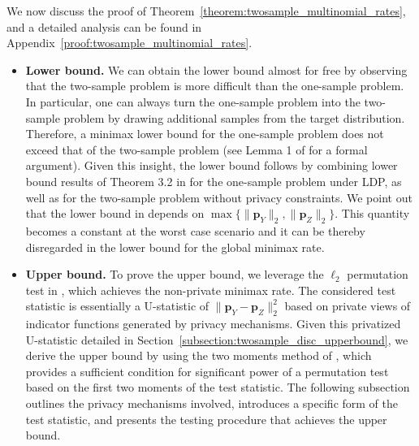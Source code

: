 \documentclass[twoside,11pt]{article}
\newcommand{\rvTwo}{Y}
\newcommand{\rvThree}{Z}
\newcommand{\vectorize}[1]{\mathbf{#1}}
\newcommand{\probVec}{\mathbf{p}} %
\begin{document}
We now discuss the proof of Theorem~\ref{theorem:twosample_multinomial_rates}, and a detailed analysis can be found in Appendix~\ref{proof:twosample_multinomial_rates}.
\begin{itemize}
	\item \textbf{Lower bound.} We can obtain the lower bound almost for free by observing that the two-sample problem is more difficult than the one-sample problem. In particular, one can always turn the one-sample problem into the two-sample problem by drawing additional samples from the target distribution. Therefore, a minimax lower bound for the one-sample problem does not exceed that of the two-sample problem  (see Lemma 1 of \citet{Arias-Castro2018RememberDimension} for a formal argument). Given this insight, the lower bound follows by combining lower bound results of Theorem 3.2 in \citep{Lam-Weil2021MinimaxConstraint} for the one-sample problem under LDP, as well as \citep{chan2014optimal,kim_minimax_2022} for the two-sample problem without privacy constraints. We point out that the lower bound in \citep{chan2014optimal,kim_minimax_2022} depends on $\max\{\|\vectorize{p}_Y\|_2, \|\vectorize{p}_Z\|_2\}$. This quantity becomes a constant at the worst case scenario and it can be thereby disregarded in the lower bound for the global minimax rate.
	\item \textbf{Upper bound.} To prove the upper bound, we leverage the $\ell_2$ permutation test in \cite{kim_minimax_2022}, which achieves the non-private minimax rate. The considered test statistic is essentially a U-statistic of $\| \probVec_\rvTwo - \probVec_\rvThree \|_2^2$ based on private views of indicator functions generated by privacy mechanisms. Given this privatized U-statistic detailed in Section~\ref{subsection:twosample_disc_upperbound}, we derive the upper bound by using the two moments method of \citet{kim_minimax_2022}, which provides a sufficient condition for significant power of a permutation test based on the first two moments of the test statistic.
	The following subsection outlines the privacy mechanisms involved,
	introduces a specific form of the test statistic,
	and presents the testing procedure that achieves the upper bound. 
\end{itemize}
\end{document}
